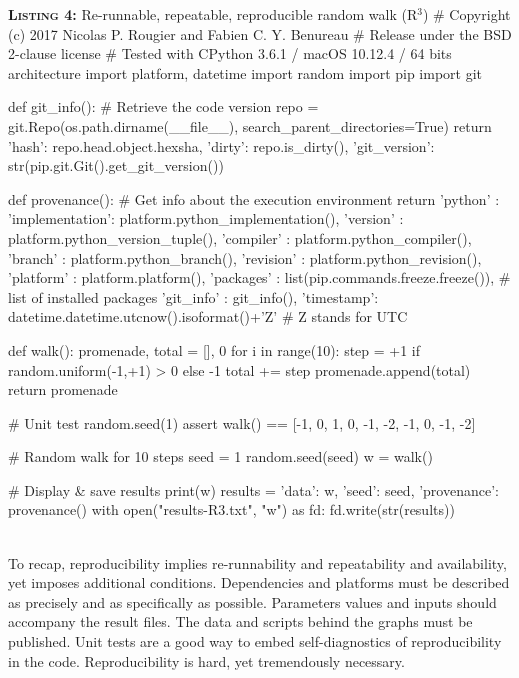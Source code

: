 \documentclass[a4paper,11pt]{article}
\begin{document}
\noindent \begin{minipage}[c]{\linewidth}
\begin{code}{\textbf{\textsc{Listing 4:}} Re-runnable, repeatable, reproducible random walk (R$^3$)}
# Copyright (c) 2017 Nicolas P. Rougier and Fabien C. Y. Benureau
# Release under the BSD 2-clause license
# Tested with CPython 3.6.1 / macOS 10.12.4 / 64 bits architecture
import platform, datetime
import random
import pip
import git

def git_info(): # Retrieve the code version
    repo = git.Repo(os.path.dirname(__file__), search_parent_directories=True)
    return {'hash': repo.head.object.hexsha, 'dirty': repo.is_dirty(),
            'git_version': str(pip.git.Git().get_git_version())}

def provenance(): # Get info about the execution environment
    return {'python'   : {'implementation': platform.python_implementation(),
                          'version'       : platform.python_version_tuple(),
                          'compiler'      : platform.python_compiler(),
                          'branch'        : platform.python_branch(),
                          'revision'      : platform.python_revision()},
            'platform' : platform.platform(),
            'packages'  : list(pip.commands.freeze.freeze()), # list of installed packages
            'git_info' : git_info(),
            'timestamp': datetime.datetime.utcnow().isoformat()+'Z'}  # Z stands for UTC

def walk():
    promenade, total = [], 0
    for i in range(10):
        step = +1 if random.uniform(-1,+1) > 0 else -1
        total += step
        promenade.append(total)
    return promenade

# Unit test
random.seed(1)
assert walk() == [-1, 0, 1, 0, -1, -2, -1, 0, -1, -2]

# Random walk for 10 steps
seed = 1
random.seed(seed)
w = walk()

# Display & save results
print(w)
results = {'data': w, 'seed': seed, 'provenance': provenance()}
with open("results-R3.txt", "w") as fd:
    fd.write(str(results))
\end{code}
\end{minipage}\\

To recap, reproducibility implies re-runnability and repeatability and availability, yet imposes additional conditions. Dependencies and platforms must be described as precisely and as specifically as possible. Parameters values and inputs should accompany the result files. The data and scripts behind the graphs must be published. Unit tests are a good way to embed self-diagnostics of reproducibility in the code. Reproducibility is hard, yet tremendously necessary.
\end{document}
